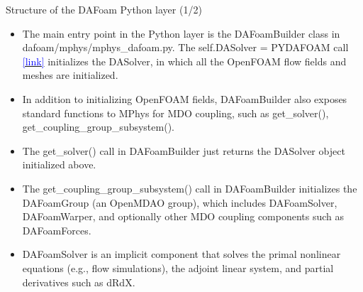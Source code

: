 \documentclass{bredelebeamer}
\begin{document}
\begin{frame}[fragile]{Structure of the DAFoam Python layer (1/2)}


\begin{itemize}
  \setlength\itemsep{0.5em}
  \item The main entry point in the Python layer is the DAFoamBuilder class in dafoam/mphys/mphys\_dafoam.py. The self.DASolver = PYDAFOAM call \href{https://github.com/mdolab/dafoam/blob/27d7279e32e62fa2c65399f3441836aefc8401c5/dafoam/mphys/mphys_dafoam.py#L73}{\textcolor{blue}{[link]}} initializes the DASolver, in which all the OpenFOAM flow fields and meshes are initialized. 
  \item In addition to initializing OpenFOAM fields, DAFoamBuilder also exposes standard functions to MPhys for MDO coupling, such as get\_solver(), get\_coupling\_group\_subsystem().
  \item The get\_solver() call in DAFoamBuilder just returns the DASolver object initialized above.
  \item The get\_coupling\_group\_subsystem() call in DAFoamBuilder initializes the DAFoamGroup (an OpenMDAO group), which includes DAFoamSolver, DAFoamWarper, and optionally other MDO coupling components such as DAFoamForces.
  \item DAFoamSolver is an implicit component that solves the primal nonlinear equations (e.g., flow simulations), the adjoint linear system, and partial derivatives such as dRdX.
  
\end{itemize}
  
\end{frame}
\end{document}
